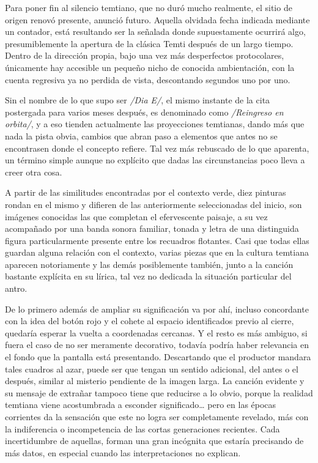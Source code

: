 \documentclass[
]{book}
\begin{document}
Para poner fin al silencio temtiano, que no duró mucho realmente, el sitio de origen renovó presente, anunció futuro. Aquella olvidada fecha indicada mediante un contador, está resultando ser la señalada donde supuestamente ocurrirá algo, presumiblemente la apertura de la clásica Temti después de un largo tiempo. Dentro de la dirección propia, bajo una vez más desperfectos protocolares, únicamente hay accesible un pequeño nicho de conocida ambientación, con la cuenta regresiva ya no perdida de vista, descontando segundos uno por uno.

Sin el nombre de lo que supo ser \emph{/Dia E/}, el mismo instante de la cita postergada para varios meses después, es denominado como \emph{/Reingreso en orbita/}, y a eso tienden actualmente las proyecciones temtianas, dando más que nada la pista obvia, cambios que abran paso a elementos que antes no se encontrasen donde el concepto refiere. Tal vez más rebuscado de lo que aparenta, un término simple aunque no explícito que dadas las circunstancias poco lleva a creer otra cosa.

A partir de las similitudes encontradas por el contexto verde, diez pinturas rondan en el mismo y difieren de las anteriormente seleccionadas del inicio, son imágenes conocidas las que completan el efervescente paisaje, a su vez acompañado por una banda sonora familiar, tonada y letra de una distinguida figura particularmente presente entre los recuadros flotantes. Casi que todas ellas guardan alguna relación con el contexto, varias piezas que en la cultura temtiana aparecen notoriamente y las demás posiblemente también, junto a la canción bastante explícita en su lírica, tal vez no dedicada la situación particular del antro.

De lo primero además de ampliar su significación va por ahí, incluso concordante con la idea del botón rojo y el cohete al espacio identificados previo al cierre, quedaría esperar la vuelta a coordenadas cercanas. Y el resto es más ambiguo, si fuera el caso de no ser meramente decorativo, todavía podría haber relevancia en el fondo que la pantalla está presentando. Descartando que el productor mandara tales cuadros al azar, puede ser que tengan un sentido adicional, del antes o el después, similar al misterio pendiente de la imagen larga. La canción evidente y su mensaje de extrañar tampoco tiene que reducirse a lo obvio, porque la realidad temtiana viene acostumbrada a esconder significado\ldots{} pero en las épocas corrientes da la sensación que este no logra ser completamente revelado, más con la indiferencia o incompetencia de las cortas generaciones recientes. Cada incertidumbre de aquellas, forman una gran incógnita que estaría precisando de más datos, en especial cuando las interpretaciones no explican.
\end{document}
